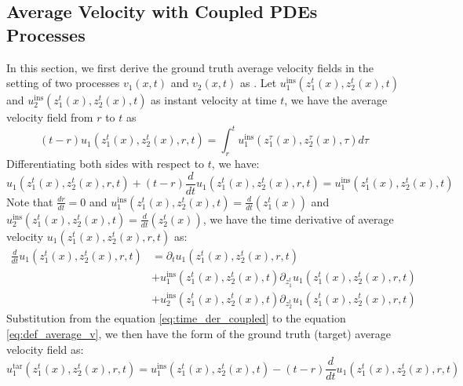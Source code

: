 \documentclass{article}
\begin{document}
\subsection{Average Velocity with Coupled PDEs Processes}
\label{sec:average_velocity_couple}
In this section, we first derive the ground truth average velocity fields in the setting of two processes $v_1(x, t)$ and $v_2(x, t)$ as \citep{geng2025mean}. Let $u^{\text{ins}}_1(z^t_1(x), z^t_2(x), t )$ and $u^{\text{ins}}_2(z^t_1(x), z^t_2(x), t )$ as instant velocity at time $t$, we have the average velocity field from $r$ to $t$ as 
\begin{equation}
    (t- r) u_1(z^t_1(x), z^t_2(x), r, t) = \int_{r}^t u^{\text{ins}}_1(z^\tau_1(x), z^\tau_2(x), \tau ) d\tau
\end{equation}
Differentiating both sides with respect to $t$, we have:
\begin{equation}
    u_1(z^t_1(x), z^t_2(x), r, t) + (t -r) \frac{d}{dt}  u_1(z^t_1(x), z^t_2(x), r, t)= u^{\text{ins}}_1(z^t_1(x), z^t_2(x), t ) \label{eq:def_average_v}
\end{equation}
Note that $\frac{dr}{dt} = 0$ and $u^{\text{ins}}_1(z^t_1(x), z^t_2(x), t ) = \frac{d}{dt} (z^t_1(x))$ and $u^{\text{ins}}_2(z^t_1(x), z^t_2(x), t ) = \frac{d}{dt} (z^t_2(x))$, we have the time derivative of average velocity $u_1(z^t_1(x), z^t_2(x), r, t)$ as: 
\begin{align}
    \frac{d}{dt}  u_1(z^t_1(x), z^t_2(x), r, t) &=\partial_t u_1(z^t_1(x), z^t_2(x), r, t) \label{eq:time_der_coupled} \\ \nonumber
    &+ u^{\text{ins}}_1( z^t_1(x), z^t_2(x), t ) \partial_{z_1^t} u_1 (z^t_1(x), z^t_2(x), r, t) \\ \nonumber
    &+u^{\text{ins}}_2(z^t_1(x), z^t_2(x), t ) \partial_{z_2^t} u_1 (z^t_1(x), z^t_2(x), r, t)
\end{align}
Substitution from the equation \ref{eq:time_der_coupled} to the equation \ref{eq:def_average_v}, we then have the form of the ground truth (target) average velocity field as: 
\begin{equation}
     u_1^{\text{tar}}(z^t_1(x), z^t_2(x), r, t) = u^{\text{ins}}_1(z^t_1(x), z^t_2(x), t ) - (t -r) \frac{d}{dt}  u_1(z^t_1(x), z^t_2(x), r, t) \label{eq:target_def_average_coupled_velocity}
\end{equation}
\end{document}
